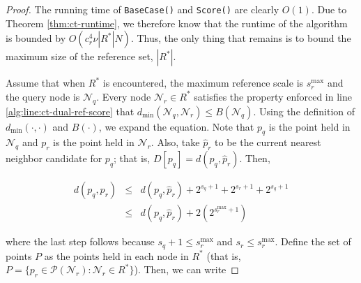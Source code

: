 \begin{proof}
The running time of \texttt{BaseCase()} and \texttt{Score()} are clearly $O(1)$.
Due to Theorem \ref{thm:ct-runtime}, we therefore know that the runtime of the
algorithm is bounded by $O(c_r^4 \nu |R^*| N)$.  Thus, the only thing that
remains is to bound the maximum size of the reference set, $|R^*|$.

Assume that when $R^*$ is encountered, the maximum reference scale is
$s_r^{\max}$ and the query node is $\mathscr{N}_q$.  Every node $\mathscr{N}_r
\in R^*$ satisfies the property enforced in line
\ref{alg:line:ct-dual-ref-score} that
$d_{\min}(\mathscr{N}_q, \mathscr{N}_r) \le B(\mathscr{N}_q)$.
Using the definition of $d_{\min}(\cdot, \cdot)$ and $B(\cdot)$, we
expand the equation.  Note that $p_q$ is the point held in $\mathscr{N}_q$ and
$p_r$ is the point held in $\mathscr{N}_r$.  Also, take $\hat{p}_r$ to be the
current nearest neighbor candidate for $p_q$; that is, $D[p_q] = d(p_q,
\hat{p}_r)$.  Then,

\vspace*{-1em}
\begin{eqnarray}
d(p_q, p_r) &\le& d(p_q, \hat{p}_r) + 2^{s_q + 1} + 2^{s_r + 1} + 2^{s_q + 1}
\label{eqn:pr_dist} \\
 &\le& d(p_q, \hat{p}_r) + 2(2^{s_r^{\max} + 1})
\end{eqnarray}
\vspace*{-0.9em}

\noindent where the last step follows because $s_q + 1 \le s_r^{\max}$ and $s_r
\le s_r^{\max}$.  Define the set of points $P$ as the points held in each node
in $R^*$ (that is, $P = \{ p_r \in \mathscr{P}(\mathscr{N}_r) : \mathscr{N}_r
\in R^* \}$).  Then, we can write

%


\end{proof}
